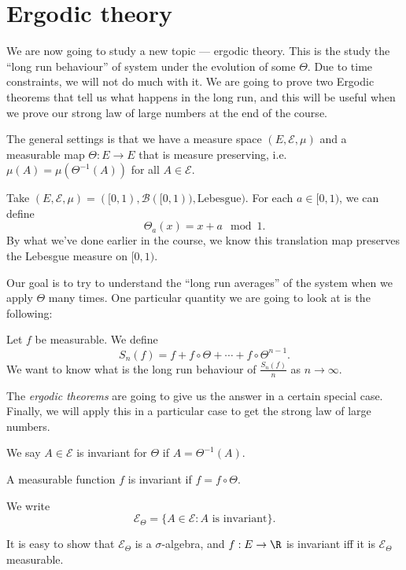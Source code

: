 \documentclass[a4paper]{article}
\begin{document}
\section{Ergodic theory}
We are now going to study a new topic --- ergodic theory. This is the study the ``long run behaviour'' of system under the evolution of some $\Theta$. Due to time constraints, we will not do much with it. We are going to prove two Ergodic theorems that tell us what happens in the long run, and this will be useful when we prove our strong law of large numbers at the end of the course.

The general settings is that we have a measure space $(E, \mathcal{E}, \mu)$ and a measurable map $\Theta: E \to E$ that is measure preserving, i.e.\ $\mu(A) = \mu(\Theta^{-1}(A))$ for all $A \in \mathcal{E}$.

\begin{eg}
  Take $(E, \mathcal{E}, \mu) = ([0, 1), \mathcal{B}([0, 1)), \mathrm{Lebesgue})$. For each $a \in [0, 1)$, we can define
  \[
    \Theta_a (x) = x + a \mod 1.
  \]
  By what we've done earlier in the course, we know this translation map preserves the Lebesgue measure on $[0, 1)$.
\end{eg}

Our goal is to try to understand the ``long run averages'' of the system when we apply $\Theta$ many times. One particular quantity we are going to look at is the following:

Let $f$ be measurable. We define
\[
  S_n(f) = f + f \circ \Theta + \cdots + f \circ \Theta^{n - 1}.
\]
We want to know what is the long run behaviour of $\frac{S_n(f)}{n}$ as $n \to \infty$.

The \emph{ergodic theorems} are going to give us the answer in a certain special case. Finally, we will apply this in a particular case to get the strong law of large numbers.

\begin{defi}
  We say $A \in \mathcal{E}$ is invariant for $\Theta$ if $A = \Theta^{-1}(A)$.
\end{defi}

\begin{defi}
  A measurable function $f$ is invariant if $f = f \circ \Theta$.
\end{defi}

\begin{defi}
  We write
  \[
    \mathcal{E}_\Theta = \{A \in \mathcal{E}: A\text{ is invariant}\}.
  \]
\end{defi}
It is easy to show that $\mathcal{E}_\Theta$ is a $\sigma$-algebra, and $f: E \to \R$ is invariant iff it is $\mathcal{E}_\Theta$ measurable.
\end{document}
